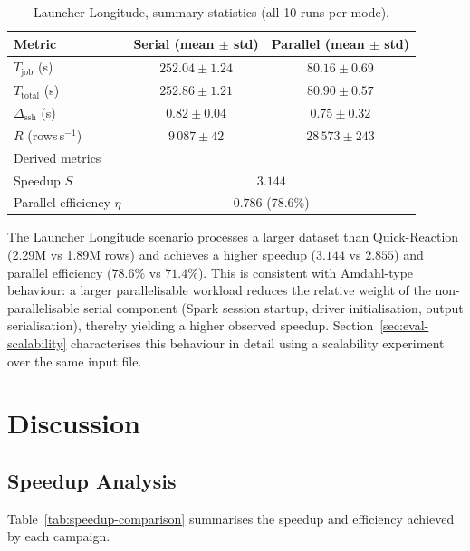 \begin{table}[htbp]
\centering
\caption{Launcher Longitude, summary statistics (all 10 runs per mode).}
\label{tab:ll-summary}
\begin{tabular}{lcc}
\toprule
Metric & Serial (mean $\pm$ std) & Parallel (mean $\pm$ std) \\
\midrule
$T_{\text{job}}$ (s)      & $252.04 \pm 1.24$   & $80.16 \pm 0.69$    \\
$T_{\text{total}}$ (s)    & $252.86 \pm 1.21$   & $80.90 \pm 0.57$    \\
$\Delta_{\text{ssh}}$ (s) & $0.82 \pm 0.04$     & $0.75 \pm 0.32$     \\
$R$ (rows\,s$^{-1}$)      & $9\,087 \pm 42$     & $28\,573 \pm 243$   \\
\midrule
\multicolumn{3}{l}{Derived metrics} \\
Speedup $S$                & \multicolumn{2}{c}{$3.144$} \\
Parallel efficiency $\eta$ & \multicolumn{2}{c}{$0.786$ (78.6\%)} \\
\bottomrule
\end{tabular}
\end{table}

The Launcher Longitude scenario processes a larger dataset than Quick-Reaction
(2.29M vs 1.89M rows) and achieves a higher speedup ($3.144$ vs $2.855$) and
parallel efficiency ($78.6\%$ vs $71.4\%$).  This is consistent with Amdahl-type
behaviour: a larger parallelisable workload reduces the relative weight of the
non-parallelisable serial component (Spark session startup, driver initialisation, output
serialisation), thereby yielding a higher observed speedup.
Section~\ref{sec:eval-scalability} characterises this behaviour in detail using a
scalability experiment over the same input file.

\section{Discussion}
\label{sec:eval-discussion}

\subsection{Speedup Analysis}
\label{subsec:eval-speedup}

Table~\ref{tab:speedup-comparison} summarises the speedup and efficiency achieved by
each campaign.

